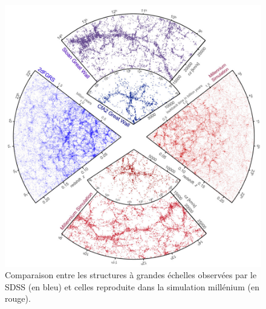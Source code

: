 \begin{figure}
        \includegraphics[width=.95\linewidth]{img/02/sdss_millenium.jpeg} 
        \caption{Comparaison entre les structures à grandes échelles observées par le SDSS (en bleu) et celles reproduite dans la simulation millénium \citep{2005Natur.435..629S} (en rouge).
 		\label{fig:sdss}}
\end{figure}
